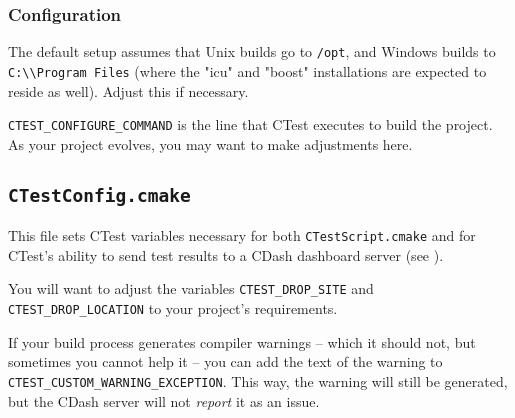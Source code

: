 \subsubsection{Configuration}

The default setup assumes that Unix builds go to \lstinline{/opt}, and Windows builds to \lstinline{C:\\Program Files} (where the "icu" and "boost" installations are expected to reside as well). Adjust this if necessary.

\lstinline{CTEST_CONFIGURE_COMMAND} is the line that CTest executes to build the project. As your project evolves, you may want to make adjustments here.

\subsection{\texttt{CTestConfig.cmake}}

This file sets CTest variables necessary for both \lstinline{CTestScript.cmake} and for CTest's ability to send test results to a CDash dashboard server (see ).

You will want to adjust the variables \lstinline{CTEST_DROP_SITE} and \lstinline{CTEST_DROP_LOCATION} to your project's requirements.

If your build process generates compiler warnings -- which it should not, but sometimes you cannot help it -- you can add the text of the warning to \lstinline{CTEST_CUSTOM_WARNING_EXCEPTION}. This way, the warning will still be generated, but the CDash server will not \emph{report} it as an issue.



